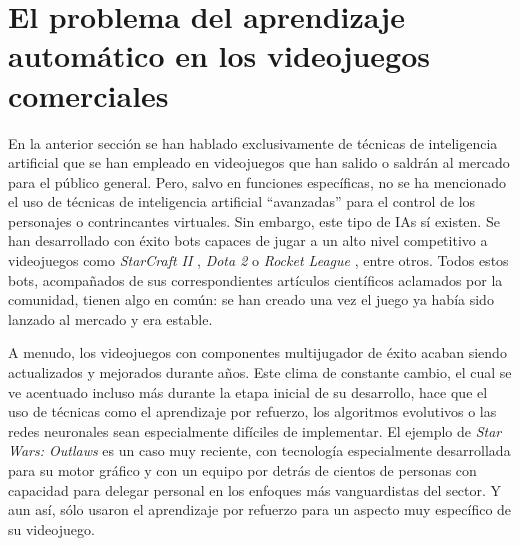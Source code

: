 

\section{El problema del aprendizaje automático en los videojuegos comerciales} \label{sec:problema_ia_videojuegos}

En la anterior sección se han hablado exclusivamente de técnicas de inteligencia artificial que se han empleado en videojuegos que han salido o saldrán al mercado para el público general. Pero, salvo en funciones específicas, no se ha mencionado el uso de técnicas de inteligencia artificial ``avanzadas'' para el control de los personajes o contrincantes virtuales. Sin embargo, este tipo de IAs sí existen. Se han desarrollado con éxito bots capaces de jugar a un alto nivel competitivo a videojuegos como \textit{StarCraft II} \cite{vinyals_grandmaster_2019}, \textit{Dota 2} \cite{openai_dota_2019} o \textit{Rocket League} \cite{moschopoulos_lucy-skg_2023}, entre otros. Todos estos bots, acompañados de sus correspondientes artículos científicos aclamados por la comunidad, tienen algo en común: se han creado una vez el juego ya había sido lanzado al mercado y era estable.

A menudo, los videojuegos con componentes multijugador de éxito acaban siendo actualizados y mejorados durante años. Este clima de constante cambio, el cual se ve acentuado incluso más durante la etapa inicial de su desarrollo, hace que el uso de técnicas como el aprendizaje por refuerzo, los algoritmos evolutivos o las redes neuronales sean especialmente difíciles de implementar. El ejemplo de \textit{Star Wars: Outlaws} es un caso muy reciente, con tecnología especialmente desarrollada para su motor gráfico y con un equipo por detrás de cientos de personas con capacidad para delegar personal en los enfoques más vanguardistas del sector. Y aun así, sólo usaron el aprendizaje por refuerzo para un aspecto muy específico de su videojuego.


